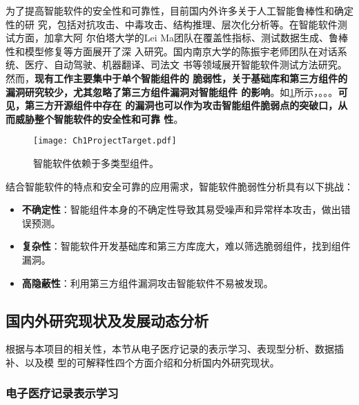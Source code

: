 
为了提高智能软件的安全性和可靠性，目前国内外许多关于人工智能鲁棒性和确定性的研
究，包括对抗攻击、中毒攻击、结构推理、层次化分析等。在智能软件测试方面，加拿大阿
尔伯塔大学的Lei Ma团队在覆盖性指标、测试数据生成、鲁棒性和模型修复等方面展开了深
入研究。国内南京大学的陈振宇老师团队在对话系统、医疗、自动驾驶、机器翻译、司法文
书等领域展开智能软件测试方法研究。然而，\textbf{现有工作主要集中于单个智能组件的
脆弱性，关于基础库和第三方组件的漏洞研究较少，尤其忽略了第三方组件漏洞对智能组件
的影响}。如\cref{fig:ch1:target}所示，。。。\textbf{可见，第三方开源组件中存在
的漏洞也可以作为攻击智能组件脆弱点的突破口，从而威胁整个智能软件的安全性和可靠
性}。
\begin{figure}[htp]
    \centering
    \texttt{[image: Ch1ProjectTarget.pdf]}
    \caption{智能软件依赖于多类型组件。}
    \label{fig:ch1:target}
\end{figure}

结合智能软件的特点和安全可靠的应用需求，智能软件脆弱性分析具有以下挑战：

\begin{itemize}
    \item[(1)]\textbf{不确定性}：智能组件本身的不确定性导致其易受噪声和异常样本攻击，做出错误预测。
    \item[(2)]\textbf{复杂性}：智能软件开发基础库和第三方库庞大，难以筛选脆弱组件，找到组件漏洞。
    \item[(3)]\textbf{高隐蔽性}：利用第三方组件漏洞攻击智能软件不易被发现。
\end{itemize}








\subsection{国内外研究现状及发展动态分析}\label{relatedwork}

根据与本项目的相关性，本节从电子医疗记录的表示学习、表现型分析、数据插补、以及模
型的可解释性四个方面介绍和分析国内外研究现状。

\subsubsection{电子医疗记录表示学习}

